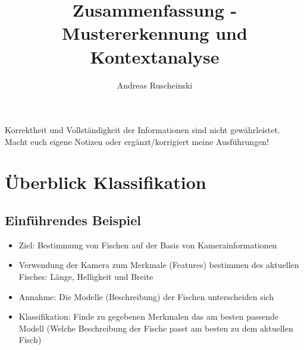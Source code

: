 \documentclass{article} %
\title{Zusammenfassung - Mustererkennung und Kontextanalyse}
\author{
	Andreas Ruscheinski
}
\begin{document}
\maketitle
\begin{framed}Korrektheit und Vollständigkeit der Informationen sind nicht gewährleistet.
Macht euch eigene Notizen oder ergänzt/korrigiert meine Ausführungen!
\end{framed}
\setcounter{tocdepth}{1}
\tableofcontents

\section{Überblick Klassifikation}
	\subsection{Einführendes Beispiel}
	\begin{itemize}
		\item Ziel: Bestimmung von Fischen auf der Basis von Kamerainformationen
		\item Verwendung der Kamera zum Merkmale (Features) bestimmen des aktuellen Fisches: Länge, Helligkeit und Breite
		\item Annahme: Die Modelle (Beschreibung) der Fischen unterscheiden sich
		\item Klassifikation: Finde zu gegebenen Merkmalen das am besten passende Modell (Welche Beschreibung der Fische passt am besten zu dem aktuellen Fisch)
	\end{itemize}
\end{document}
